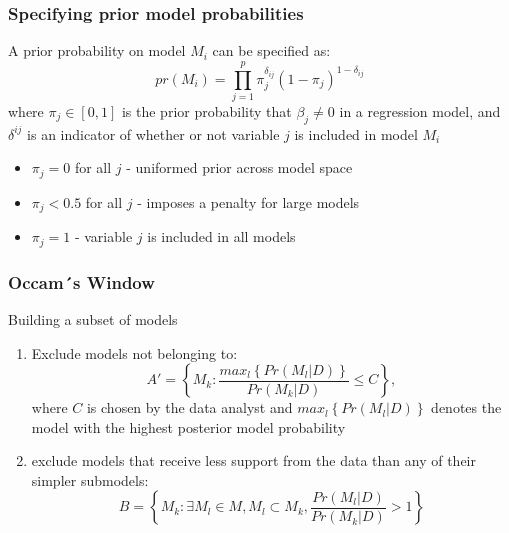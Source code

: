 \documentclass[hyperref={pdfpagelabels=true}]{beamer}
\begin{document}
\begin{frame}
\frametitle{Specifying prior model probabilities}
A prior probability on model $M_{i}$ can be specified as:
\[
pr(M_{i})=\prod_{j=1}^{p}\pi_{j}^{\delta_{ij}}(1-\pi_{j})^{1-\delta_{ij}}
\]
where $\pi_{j} \in [0,1]$ is the prior probability that $\beta_{j}\neq 0$ in a regression model, and $\delta^{ij}$ is an indicator of whether or not variable $j$ is included in model $M_{i}$
\begin{itemize}
\item $\pi_{j}=0$ for all $j$ - uniformed prior across model space
\item $\pi_{j}<0.5$ for all $j$ - imposes a penalty for large models
\item $\pi_{j}=1$ - variable $j$ is included in all models
\end{itemize}
\end{frame}


\begin{frame}
\frametitle{Occam´s Window \cite{Madigan.1994}}
Building a subset of models\\
\begin{enumerate}
\item Exclude models not belonging to:
\[
A'= \left\{M_{k}: \frac{max_{l}\left\{Pr(M_{l}|D)\right\}}{Pr(M_{k}|D)}\leq C\right\},
\]
where $C$ is chosen by the data analyst and $max_{l}\left\{Pr(M_{l}|D)\right\}$ denotes the model with the highest posterior model probability
\item exclude models that receive less support from the data than any of their simpler submodels:
\[
B = \left\{M_{k}: \exists M_{l} \in M, M_{l}\subset M_{k}, \frac{Pr(M_{l}|D)}{Pr(M_{k}|D)} > 1 \right\}
\]
\end{enumerate}
\end{frame}
\end{document}
